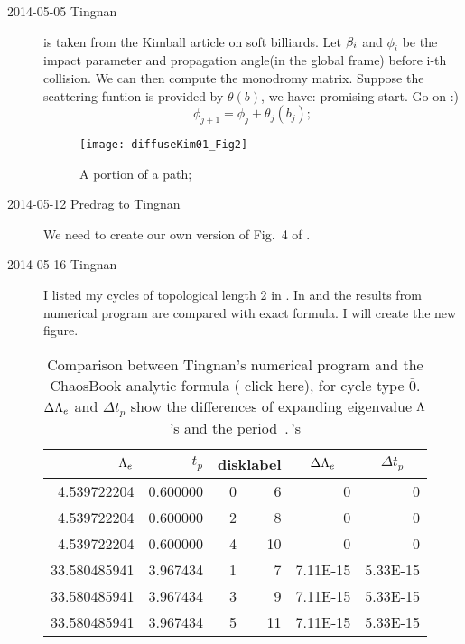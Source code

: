 \begin{description}
\item[2014-05-05 Tingnan]
 is taken from the Kimball article on soft
    billiards. Let $\beta_i$ and $\phi_i$ be the impact parameter and
    propagation angle(in the global frame) before i-th collision. We
    can then compute the monodromy matrix. Suppose the scattering
    funtion is provided by $\theta(b)$, we have:
     {promising start. Go on :)}
\[
\phi_{j+1} = \phi_j + \theta_j(b_j);
\]


\begin{figure}
\begin{center}
\texttt{[image: diffuseKim01\_Fig2]}
\end{center}
\caption{
	A portion of a path;
}
\label{KimFig2}
\end{figure}

\item[2014-05-12 Predrag to Tingnan]
We need to create our own version of Fig.~4 of .


\item[2014-05-16 Tingnan] I listed my cycles of topological
    length 2 in . In 
    and  the results from numerical program are
    compared with exact formula. I will create the new figure.

\begin{table}[htbp]
  \centering
  \caption{Comparison between Tingnan's numerical program and
  the ChaosBook analytic formula
  (
  {click here}), for cycle type $\bar{0}$. $\Delta\Lambda_e$ and $\Delta t_p$ show the differences of expanding eigenvalue $\Lambda$'s and  the period $\period{}$'s}
    \begin{tabular}{|r|r|rr|r|r|}
	\hline
    $\Lambda_e$ & $t_p$    & \multicolumn{2}{c|}{disklabel} &\multicolumn{1}{c|}{ $\Delta\Lambda_e$} & \multicolumn{1}{c|}{$\Delta t_p$} \\\hline
    4.539722204 & 0.600000 & 0     & 6     &  0     & 0 \\
    4.539722204 & 0.600000 & 2     & 8     &  0     & 0 \\
    4.539722204 & 0.600000 & 4     & 10    &  0     & 0 \\
    33.580485941 & 3.967434 & 1     & 7     &  7.11E-15 & 5.33E-15 \\
    33.580485941 & 3.967434 & 3     & 9     &  7.11E-15 & 5.33E-15 \\
    33.580485941 & 3.967434 & 5     & 11    &  7.11E-15 & 5.33E-15 \\
    \hline
    \end{tabular}%
  \label{tab:comparison0}%
\end{table}%


\end{description}
